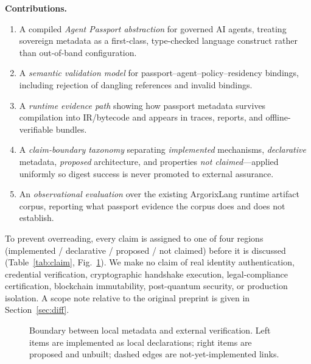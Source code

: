 \documentclass[conference]{IEEEtran}
\newcommand{\code}[1]{\texttt{\small #1}}
\newcommand{\Argorix}{%
\textcolor{argViolet}{A}\textcolor{argViolet}{r}\textcolor{argIndigo}{g}\textcolor{argIndigo}{o}\textcolor{argElectric}{r}\textcolor{argElectric}{i}\textcolor{argElectric}{x}\textcolor{argCyan}{L}\textcolor{argCyan}{a}\textcolor{argCyanBright}{n}\textcolor{argCyanBright}{g}\xspace}
\begin{document}
\noindent\textbf{Contributions.}
\begin{enumerate}
\item A compiled \emph{Agent Passport abstraction} for governed AI agents,
treating sovereign metadata as a first-class, type-checked language construct
rather than out-of-band configuration.
\item A \emph{semantic validation model} for passport--agent--policy--residency
bindings, including rejection of dangling references and invalid bindings.
\item A \emph{runtime evidence path} showing how passport metadata survives
compilation into IR/bytecode and appears in traces, reports, and
offline-verifiable bundles.
\item A \emph{claim-boundary taxonomy} separating \emph{implemented} mechanisms,
\emph{declarative} metadata, \emph{proposed} architecture, and properties
\emph{not claimed}---applied uniformly so digest success is never promoted to
external assurance.
\item An \emph{observational evaluation} over the existing \Argorix runtime
artifact corpus, reporting what passport evidence the corpus does and does not
establish.
\end{enumerate}

To prevent overreading, every claim is assigned to one of four regions
(implemented / declarative / proposed / not claimed) before it is discussed
(Table~\ref{tab:claim}, Fig.~\ref{fig:boundary}). We make no claim of real
identity authentication, credential verification, cryptographic handshake
execution, legal-compliance certification, blockchain immutability,
post-quantum security, or production isolation. A scope note relative to the
original preprint is given in Section~\ref{sec:diff}.

\begin{figure}[t]
\centering
{}
\caption{Boundary between local metadata and external verification. Left items
are implemented as local declarations; right items are proposed and unbuilt;
dashed edges are not-yet-implemented links.}
\label{fig:boundary}
\end{figure}
\end{document}
